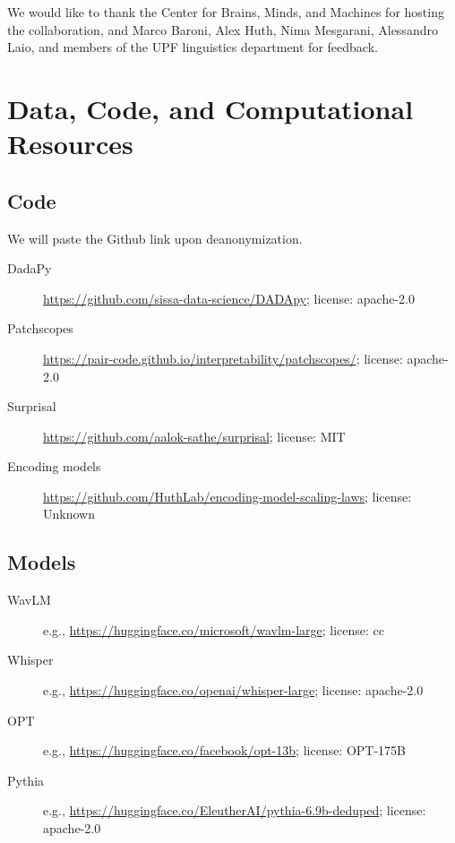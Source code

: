 \documentclass{article}
\theoremstyle{plain}
\theoremstyle{definition}
\theoremstyle{remark}
\begin{document}
We would like to thank the Center for Brains, Minds, and Machines for hosting the collaboration, and Marco Baroni, Alex Huth, Nima Mesgarani, Alessandro Laio, and members of the UPF linguistics department for feedback. 




\newpage
\appendix
{}

\renewcommand\thefigure{\thesection.\arabic{figure}}    
\renewcommand\thetable{\thesection.\arabic{table}}
\renewcommand\theequation{\thesection.\arabic{equation}}
\onecolumn

\section{Data, Code, and Computational Resources}
\label{app:data_code}
\setcounter{figure}{0}    
\setcounter{table}{0} 

\subsection{Code} We will paste the Github link upon deanonymization.
\begin{description}
    \item[DadaPy] \url{https://github.com/sissa-data-science/DADApy}; license: apache-2.0
    \item[Patchscopes] \url{https://pair-code.github.io/interpretability/patchscopes/}; license: apache-2.0
    \item[Surprisal] \url{https://github.com/aalok-sathe/surprisal}; license: MIT
    \item[Encoding models] \url{https://github.com/HuthLab/encoding-model-scaling-laws}; license: Unknown
\end{description}

\subsection{Models}
\begin{description}
    \item[WavLM] e.g., \url{https://huggingface.co/microsoft/wavlm-large}; license: cc
    \item[Whisper] e.g., \url{https://huggingface.co/openai/whisper-large}; license: apache-2.0
    \item[OPT] e.g., \url{https://huggingface.co/facebook/opt-13b}; license: OPT-175B
    \item[Pythia] e.g., \url{https://huggingface.co/EleutherAI/pythia-6.9b-deduped}; license: apache-2.0
\end{description}
\end{document}
